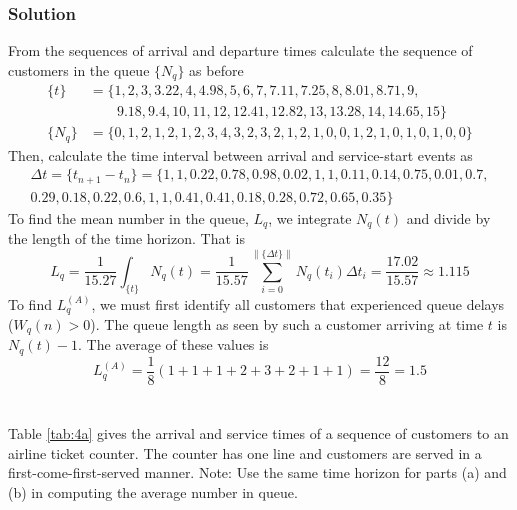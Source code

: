 \documentclass[letterpaper]{amsart}
\begin{document}
\subsubsection*{Solution}
From the sequences of arrival and departure times calculate the sequence of
customers in the queue $\{N_q\}$ as before
\begin{align*}
  \{t\}&=\{1, 2, 3, 3.22, 4, 4.98, 5, 6, 7, 7.11, 7.25, 8, 8.01, 8.71, 9,\\
  &\quad\quad 9.18, 9.4, 10, 11, 12, 12.41, 12.82, 13, 13.28, 14, 14.65, 15\}\\
    \{N_q\}&=\{0, 1, 2, 1, 2, 1, 2, 3, 4, 3, 2, 3, 2, 1, 2, 1, 0, 0, 1, 2, 1, 0, 1, 0, 1, 0, 0\}
\end{align*}
Then, calculate the time interval between arrival and service-start events as
\begin{align*}
  \Delta t=\{t_{n+1}-t_{n}\} = \{1, 1, 0.22, 0.78, 0.98, 0.02, 1, 1, 0.11, 0.14, 0.75, 0.01, 0.7,\\
  0.29, 0.18, 0.22, 0.6, 1, 1, 0.41, 0.41, 0.18, 0.28, 0.72, 0.65, 0.35\}
\end{align*}
To find the mean number in the queue, $L_q$, we integrate $N_q(t)$ and divide by
the length of the time horizon. That is
\begin{equation*}
  L_q = \frac{1}{15.27}\int_{\{t\}}N_q(t) = \frac{1}{15.57}\sum_{i=0}^{\|\{\Delta t\}\|}N_q(t_i)\Delta t_i
  =\frac{17.02}{15.57}\approx 1.115
\end{equation*}
To find $L_q^{(A)}$, we must first identify all customers that experienced queue
delays ($W_q{(n)}>0$). The queue length as seen by such a customer arriving at
time $t$ is $N_q(t)-1$. The average of these values is
\begin{equation*}
  L_q^{(A)} = \frac{1}{8}(1+1+1+2+3+2+1+1) = \frac{12}{8}=1.5
\end{equation*}

\section{} %
Table \ref{tab:4a} gives the arrival and service times of a sequence of customers to
an airline ticket counter. The counter has one line and customers are served in a
first-come-first-served manner. Note: Use the same time horizon for parts (a) and
(b) in computing the average number in queue.
\end{document}
